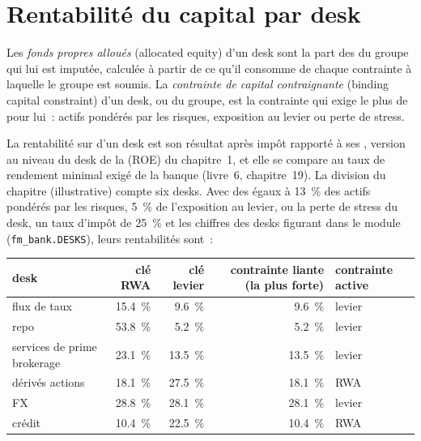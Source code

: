 \section{Rentabilité du capital par desk}

\begin{definition}\label{def:fm:the-bank-markets-division:alloc}
Les \emph{fonds propres alloués} (allocated equity) d'un desk sont la part des  du groupe qui lui est imputée, calculée à partir de ce qu'il consomme de
chaque contrainte à laquelle le groupe est soumis. La \emph{contrainte de capital contraignante} (binding capital constraint) d'un desk, ou du groupe, est la
contrainte qui exige le plus de  pour lui~: actifs pondérés par les risques, exposition au levier ou perte de stress.
\end{definition}

La rentabilité sur  d'un desk est son résultat après impôt rapporté à ses , version au niveau du desk de la 
(ROE) du chapitre~1, et elle se compare au taux de rendement minimal exigé de la banque (livre~6, chapitre~19). La division du chapitre (illustrative) compte six desks.
Avec des  égaux à 13~\% des actifs pondérés par les risques, 5~\% de l'exposition au levier, ou la perte de stress du desk, un taux d'impôt de 25~\% et les chiffres des desks figurant dans le
module (\texttt{fm\_bank.DESKS}), leurs rentabilités sont~:

\begin{center}
\small
\begin{tabular}{@{}lrrrl@{}}
\toprule
desk & clé RWA & clé levier & contrainte liante (la plus forte) & contrainte active\\
\midrule
flux de taux & 15.4~\% & 9.6~\% & 9.6~\% & levier\\
repo & 53.8~\% & 5.2~\% & 5.2~\% & levier\\
services de prime brokerage & 23.1~\% & 13.5~\% & 13.5~\% & levier\\
dérivés actions & 18.1~\% & 27.5~\% & 18.1~\% & RWA\\
FX & 28.8~\% & 28.1~\% & 28.1~\% & levier\\
crédit & 10.4~\% & 22.5~\% & 10.4~\% & RWA\\
\bottomrule
\end{tabular}
\end{center}

